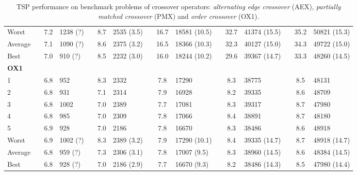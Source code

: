 \begin{sidewaystable}[hbpt]
{\begin{tabular} {l l S  l l S l l S l l S l l S l}
Worst  &&  7.2 & 1238 (?) && 8.7 & 2535 (3.5) && 16.7  & 18581 (10.5) &&  32.7   & 41374  (15.5) &&  35.2  & 50821 (15.3)  \\
Average&&  7.1 & 1090 (?) && 8.6 & 2375 (3.2) &&  16.5  &  18366 (10.3) &&  32.3 & 40127 (15.0) && 34.3  & 49722 (15.0)    \\
Best   && 7.0 & 910 (?) && 8.5 & 2232 (3.0)  &&  16.0  &  18244 (10.2) &&  29.6 & 39367 (14.7) && 33.3  &  48260 (14.5)     
\\\midrule\addlinespace\addlinespace
\textbf{OX1}\\
1   &&  6.8 & 952 && 8.3 & 2332  && 7.8 & 17290  && 8.3 & 38775 && 8.5 & 48131 \\
2   &&  6.8 & 931 && 7.1 & 2314  && 7.9 & 16928 && 8.2 & 39335 && 8.6 & 48709   \\
3   &&  6.8 & 1002 && 7.0 & 2389 &&  7.7 & 17081 && 8.3 & 39317 && 8.7 & 47980    \\
4   &&  6.8 & 985 && 7.0 & 2309  && 7.8 & 17066 && 8.4 & 38891 && 8.7 & 48180 \\
5   &&  6.9 & 928 &&  7.0 & 2186  && 7.8 & 16670 && 8.3 & 38486 && 8.6 & 48918  \\ \addlinespace
Worst  &&  6.9 & 1002 (?) && 8.3 & 2389 (3.2) && 7.9 & 17290 (10.1) && 8.4 & 39335 (14.7) && 8.7 & 48918 (14.7)  \\
Average&&  6.8& 959 (?) && 7.3 & 2306 (3.1) && 7.8 & 17007 (9.5) && 8.3 & 38960 (14.5) && 8.6 & 48384 (14.5)    \\
Best   && 6.8 & 928 (?) && 7.0 & 2186 (2.9)  && 7.7 & 16670 (9.3)&& 8.2 & 38486 (14.3) && 8.5 & 47980 (14.4)     \\
\bottomrule
\end{tabular}}
\caption[TSP performance on benchmark problems of crossover operators (1).]{TSP performance on benchmark problems of crossover operators: \emph{alternating edge crossover} (AEX), \emph{partially matched crossover} (PMX) and \emph{order crossover} (OX1).}
\label{tab:crossover}
\end{sidewaystable}



